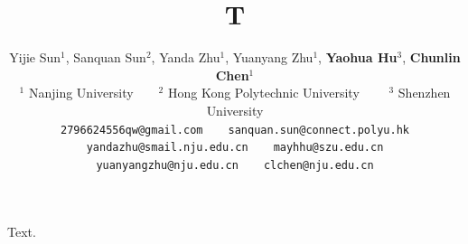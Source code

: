 \documentclass{article}
\title{T}
\author{Yijie Sun$^1$, Sanquan Sun$^2$, Yanda Zhu$^1$, Yuanyang Zhu$^1$, \textbf{Yaohua Hu}$^3$, \textbf{Chunlin Chen}$^{1}$ \\
$^1$ Nanjing University~~~~$^2$ Hong Kong Polytechnic University~~~~ $^3$ Shenzhen University \\
\texttt{2796624556qw@gmail.com}~~~~\texttt{sanquan.sun@connect.polyu.hk} \\
\texttt{yandazhu@smail.nju.edu.cn}~~~~\texttt{mayhhu@szu.edu.cn} \\
\texttt{yuanyangzhu@nju.edu.cn}~~~~\texttt{clchen@nju.edu.cn}}
\begin{document}
\maketitle
Text.
\end{document}
